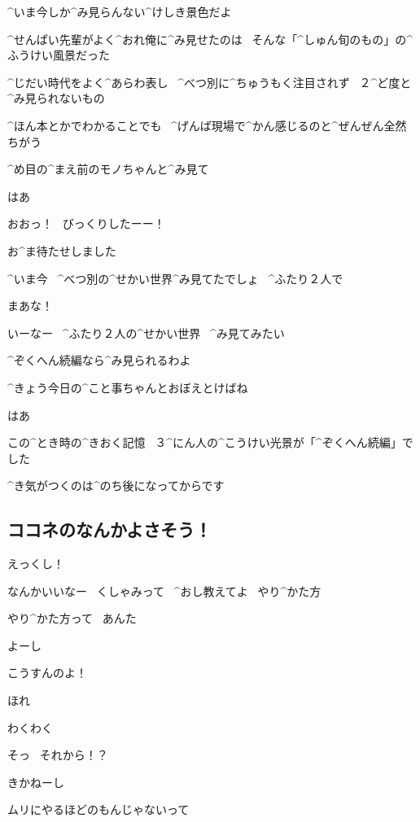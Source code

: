 \Sensei ^{いま}{今}しか^{み}{見}らんない^{けしき}{景色}だよ

\Ojisan ^{せんぱい}{先輩}がよく^{おれ}{俺}に^{み}{見}せたのは
\ そんな「^{しゅん}{旬}のもの」の^{ふうけい}{風景}だった

\Ojisan ^{じだい}{時代}をよく^{あらわ}{表}し
\ ^{べつ}{別}に^{ちゅうもく}{注目}されず
\ ２^{ど}{度}と^{み}{見}られないもの

\page[122]
\Sensei ^{ほん}{本}とかでわかることでも
\ ^{げんば}{現場}で^{かん}{感}じるのと^{ぜんぜん}{全然}ちがう

\Sensei ^{め}{目}の^{まえ}{前}のモノちゃんと^{み}{見}て

\page[123]
\Ojisan はあ

\page[124]
\Ojisan おおっ！
\ びっくりしたーー！

\Alpha お^{ま}{待}たせしました

\Alpha ^{いま}{今}
\ ^{べつ}{別}の^{せかい}{世界}^{み}{見}てたでしょ
\ ^{ふたり}{２人}で

\Ojisan まあな！

\page[125]
\Alpha いーなー
\ ^{ふたり}{２人}の^{せかい}{世界}
\ ^{み}{見}てみたい

\Sensei ^{ぞくへん}{続編}なら^{み}{見}られるわよ

\Sensei ^{きょう}{今日}の^{こと}{事}ちゃんとおぼえとけばね

\Alpha はあ

\page[126]
\Alpha この^{とき}{時}の^{きおく}{記憶}
\ ３^{にん}{人}の^{こうけい}{光景}が「^{ぞくへん}{続編}」でした

\Alpha ^{き}{気}がつくのは^{のち}{後}になってからです


\subsection{ココネのなんかよさそう！}

\Shiba えっくし！

\Kokone なんかいいなー
\ くしゃみって
\ ^{おし}{教}えてよ
\ やり^{かた}{方}

\Shiba やり^{かた}{方}って
\ あんた

\Shiba よーし

\Shiba こうすんのよ！

\Shiba ほれ

\Kokone わくわく

\Kokone そっ
\ それから！？

\Shiba きかねーし

\Shiba ムリにやるほどのもんじゃないって
